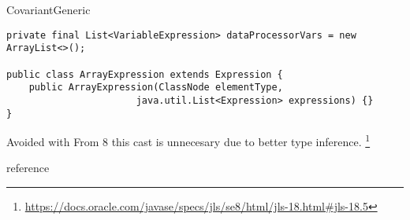 \begin{pattern}{CovariantGeneric}
\begin{verbatim}
private final List<VariableExpression> dataProcessorVars = new ArrayList<>();

public class ArrayExpression extends Expression {
    public ArrayExpression(ClassNode elementType,
                       java.util.List<Expression> expressions) {}
}
\end{verbatim}

\detection{}

\discussion{}

Avoided with
From \java{} 8 this cast is unnecesary due to better type inference.
\footnote{\url{https://docs.oracle.com/javase/specs/jls/se8/html/jls-18.html\#jls-18.5}}

reference \cite{altidorTamingWildcardsCombining2011}

\related{}

\end{pattern}